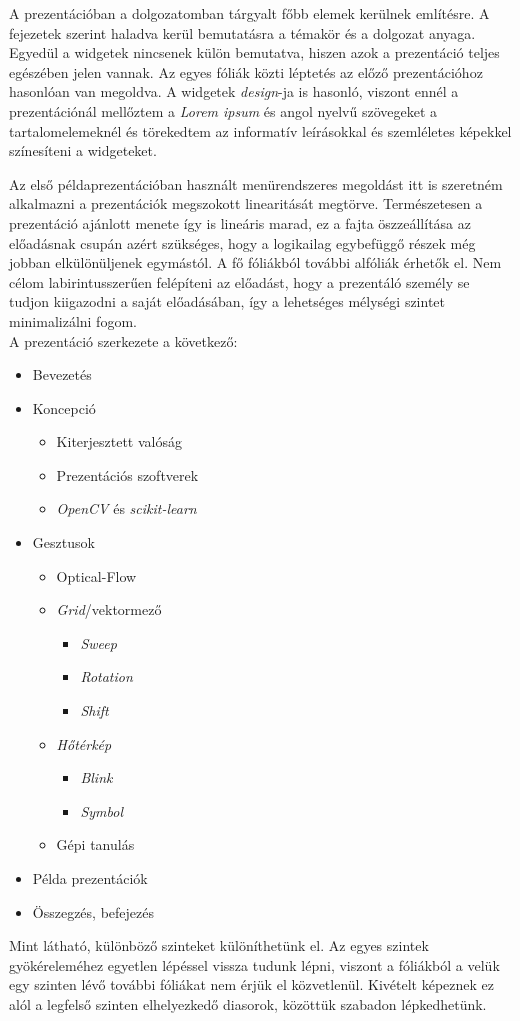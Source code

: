 A prezentációban a dolgozatomban tárgyalt főbb elemek kerülnek említésre. A fejezetek szerint haladva kerül bemutatásra a témakör és a dolgozat anyaga. Egyedül a widgetek nincsenek külön bemutatva, hiszen azok a prezentáció teljes egészében jelen vannak. Az egyes fóliák közti léptetés az előző prezentációhoz hasonlóan van megoldva. A widgetek \textit{design}-ja is hasonló, viszont ennél a prezentációnál mellőztem a \textit{Lorem ipsum} és angol nyelvű szövegeket a tartalomelemeknél és törekedtem az informatív leírásokkal és szemléletes képekkel színesíteni a widgeteket.

Az első példaprezentációban használt menürendszeres megoldást itt is szeretném alkalmazni a prezentációk megszokott linearitását megtörve. Természetesen a prezentáció ajánlott menete így is lineáris marad, ez a fajta öszzeállítása az előadásnak csupán azért szükséges, hogy a logikailag egybefüggő részek még jobban elkülönüljenek egymástól. A fő fóliákból további alfóliák érhetők el. Nem célom labirintusszerűen felépíteni az előadást, hogy a prezentáló személy se tudjon kiigazodni a saját előadásában, így a lehetséges mélységi szintet minimalizálni fogom.\\
A prezentáció szerkezete a következő:
\begin{itemize}
	\item Bevezetés
	\item Koncepció
		\begin{itemize}
			\item Kiterjesztett valóság
			\item Prezentációs szoftverek
			\item \textit{OpenCV} és \textit{scikit-learn}
		\end{itemize}
	\item Gesztusok
		\begin{itemize}
			\item Optical-Flow
			\item \textit{Grid}/vektormező
				\begin{itemize}
					\item \textit{Sweep}
					\item \textit{Rotation}
					\item \textit{Shift}
				\end{itemize}
			\item \textit{Hőtérkép}
				\begin{itemize}
					\item \textit{Blink}
					\item \textit{Symbol}
				\end{itemize}
			\item Gépi tanulás
		\end{itemize}
	\item Példa prezentációk
	\item Összegzés, befejezés
\end{itemize}
Mint látható, különböző szinteket különíthetünk el. Az egyes szintek gyökéreleméhez egyetlen lépéssel vissza tudunk lépni, viszont a fóliákból a velük egy szinten lévő további fóliákat nem érjük el közvetlenül. Kivételt képeznek ez alól a legfelső szinten elhelyezkedő diasorok, közöttük szabadon lépkedhetünk.

